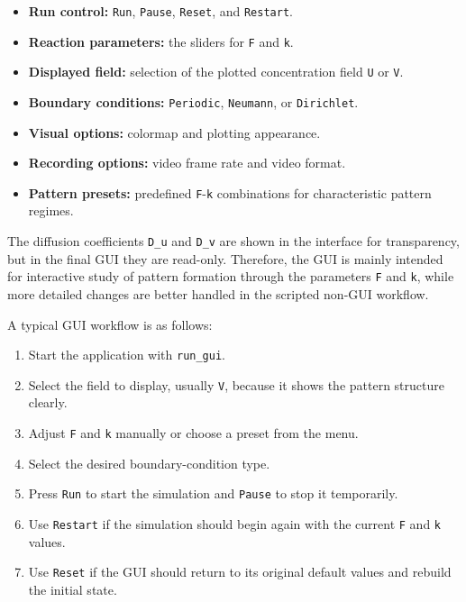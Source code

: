 \begin{itemize}
    \item \textbf{Run control:} \texttt{Run}, \texttt{Pause}, \texttt{Reset}, and \texttt{Restart}.
    \item \textbf{Reaction parameters:} the sliders for \texttt{F} and \texttt{k}.
    \item \textbf{Displayed field:} selection of the plotted concentration field \texttt{U} or \texttt{V}.
    \item \textbf{Boundary conditions:} \texttt{Periodic}, \texttt{Neumann}, or \texttt{Dirichlet}.
    \item \textbf{Visual options:} colormap and plotting appearance.
    \item \textbf{Recording options:} video frame rate and video format.
    \item \textbf{Pattern presets:} predefined \texttt{F}-\texttt{k} combinations for characteristic pattern regimes.
\end{itemize}

The diffusion coefficients \texttt{D\_u} and \texttt{D\_v} are shown in the interface for transparency, but in the final GUI they are read-only. Therefore, the GUI is mainly intended for interactive study of pattern formation through the parameters \texttt{F} and \texttt{k}, while more detailed changes are better handled in the scripted non-GUI workflow.

A typical GUI workflow is as follows:

\begin{enumerate}
    \item Start the application with \texttt{run\_gui}.
    \item Select the field to display, usually \texttt{V}, because it shows the pattern structure clearly.
    \item Adjust \texttt{F} and \texttt{k} manually or choose a preset from the menu.
    \item Select the desired boundary-condition type.
    \item Press \texttt{Run} to start the simulation and \texttt{Pause} to stop it temporarily.
    \item Use \texttt{Restart} if the simulation should begin again with the current \texttt{F} and \texttt{k} values.
    \item Use \texttt{Reset} if the GUI should return to its original default values and rebuild the initial state.
\end{enumerate}

